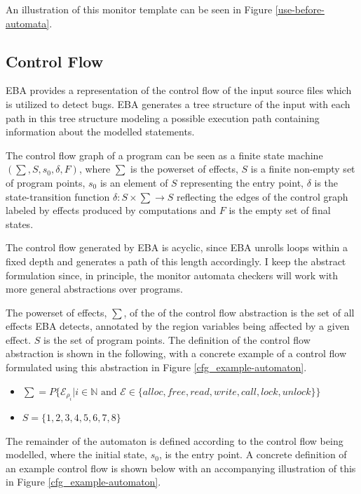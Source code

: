 An illustration of this monitor template can be seen in Figure \ref{use-before-automata}. 

\subsection{Control Flow}

EBA provides a representation of the control flow of the input source files which is utilized to detect bugs. EBA generates a tree structure of the input with each path in this tree structure modeling a possible execution path containing information about the modelled statements. 

\newpar The control flow graph of a program can be seen as a finite state machine $(\sum, S, s_0, \delta, F)$, where $\sum$ is the powerset of effects, $S$ is a finite non-empty set of program points, $s_0$ is an element of $S$ representing the entry point, $\delta$ is the state-transition function $\delta: S \times \sum \rightarrow S$ reflecting the edges of the control graph labeled by effects produced by computations and $F$ is the empty set of final states. 

\newpar The control flow generated by EBA is acyclic, since EBA unrolls loops within a fixed depth and generates a path of this length accordingly. I keep the abstract formulation since, in principle, the monitor automata checkers will work with more general abstractions over programs.

\newpar The powerset of effects, $\sum$, of the of the control flow abstraction is the set of all effects EBA detects, annotated by the region variables being affected by a given effect. $S$ is the set of program points. The definition of the control flow abstraction is shown in the following, with a concrete example of a control flow formulated using this abstraction in Figure \ref{cfg_example-automaton}. 

\begin{itemize}
    \item $\sum = P\{ \mathcal{E}_{\rho_i} | i \in \mathbb{N} \text{ and } \mathcal{E} \in \{ alloc, free, read, write, call, lock, unlock\}\}$
    \item $S = \{1, 2, 3, 4, 5, 6, 7, 8\}$
\end{itemize}

\noindent The remainder of the automaton is defined according to the control flow being modelled, where the initial state, $s_0$, is the entry point. A concrete definition of an example control flow is shown below with an accompanying illustration of this in Figure \ref{cfg_example-automaton}.

